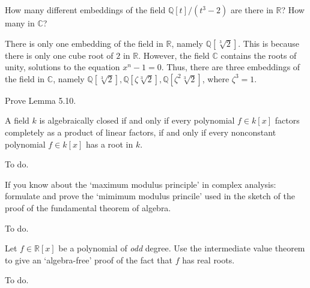 \documentclass[../../master.tex]{subfiles}
\begin{document}
\begin{problem}
    How many different embeddings of the field $\mathbb{Q}[t] / (t^3 - 2)$ are there in $\mathbb{R}$?
    How many in $\mathbb{C}$?
\end{problem}

\begin{solution}
    There is only one embedding of the field in $\mathbb{R}$, namely $\mathbb{Q}[\sqrt[3]{2}]$.
    This is because there is only one cube root of $2$ in $\mathbb{R}$.
    However, the field $\mathbb{C}$ contains the roots of unity, solutions to the equation $x^{n} - 1 = 0$.
    Thus, there are three embeddings of the field in $\mathbb{C}$, namely $\mathbb{Q}[\sqrt[3]{2}], \mathbb{Q}[\zeta \sqrt[3]{2}], \mathbb{Q}[\zeta^2 \sqrt[3]{2}]$, where $\zeta^3 = 1$.
\end{solution}

\begin{problem}
    Prove Lemma 5.10.
    \begin{proposition}[Lemma 5.10] 
        A field $k$ is algebraically closed if and only if every polynomial $f \in k[x]$ factors completely as a product of linear factors, if and only if every nonconstant polynomial $f \in k[x]$ has a root in $k$.
    \end{proposition}
\end{problem}

\begin{solution}
    To do.
\end{solution}

\begin{problem}
    If you know about the `maximum modulus principle' in complex analysis:
    formulate and prove the `mimimum modulus princile' used in the sketch of the proof of the fundamental theorem of algebra.
\end{problem}

\begin{solution}
    To do.
\end{solution}

\begin{problem}
    Let $f \in \mathbb{R}[x]$ be a polynomial of \textit{odd} degree.
    Use the intermediate value theorem to give an `algebra-free' proof of the fact that $f$ has real roots.
\end{problem}

\begin{solution}
    To do.
\end{solution}
\end{document}
